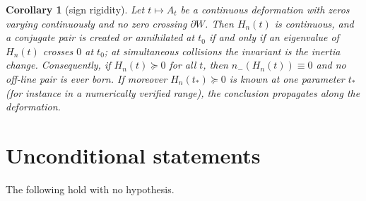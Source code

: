 \documentclass[11pt]{article}
\theoremstyle{plain}
\newtheorem{corollary}[theorem]{Corollary}
\theoremstyle{definition}
\theoremstyle{remark}
\begin{document}
\begin{corollary}[sign rigidity]\label{cor:rigidity}
Let $t\mapsto A_t$ be a continuous deformation with zeros varying continuously and no
zero crossing $\partial W$. Then $H_n(t)$ is continuous, and a conjugate pair is created
or annihilated at $t_0$ if and only if an eigenvalue of $H_n(t)$ crosses $0$ at $t_0$;
at simultaneous collisions the invariant is the inertia change. Consequently, if
$H_n(t)\succeq 0$ for all $t$, then $n_-(H_n(t))\equiv 0$ and no off-line pair is ever
born. If moreover $H_n(t_\ast)\succeq0$ is known at one parameter $t_\ast$ (for instance
in a numerically verified range), the conclusion propagates along the deformation.
\end{corollary}

\section{Unconditional statements}

The following hold with no hypothesis.
\end{document}
